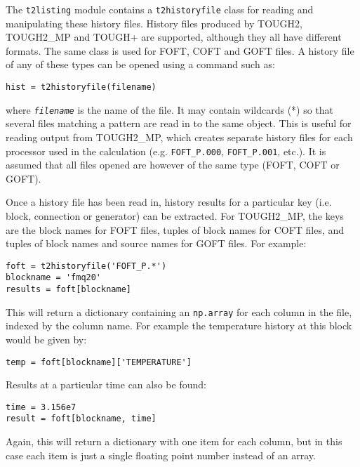 The \texttt{t2listing} module contains a \texttt{t2historyfile} class for reading and manipulating these history files.  History files produced by TOUGH2, TOUGH2\_MP and TOUGH+ are supported, although they all have different formats.  The same class is used for FOFT, COFT and GOFT files.  A history file of any of these types can be opened using a command such as:

\begin{lstlisting}
hist = t2historyfile(filename)
\end{lstlisting}

where \texttt{\emph{filename}} is the name of the file.  It may contain wildcards (*) so that several files matching a pattern are read in to the same object.  This is useful for reading output from TOUGH2\_MP, which creates separate history files for each processor used in the calculation (e.g. \texttt{FOFT\_P.000}, \texttt{FOFT\_P.001}, etc.).  It is assumed that all files opened are however of the same type (FOFT, COFT or GOFT).

Once a history file has been read in, history results for a particular key (i.e. block, connection or generator) can be extracted.  For TOUGH2\_MP, the keys are the block names for FOFT files, tuples of block names for COFT files, and tuples of block names and source names for GOFT files.  For example:

\begin{lstlisting}
foft = t2historyfile('FOFT_P.*')
blockname = 'fmq20'
results = foft[blockname]
\end{lstlisting}

This will return a dictionary containing an \texttt{np.array} for each column in the file, indexed by the column name.  For example the temperature history at this block would be given by:

\begin{lstlisting}
temp = foft[blockname]['TEMPERATURE']
\end{lstlisting}

Results at a particular time can also be found:

\begin{lstlisting}
time = 3.156e7
result = foft[blockname, time]
\end{lstlisting}

Again, this will return a dictionary with one item for each column, but in this case each item is just a single floating point number instead of an array.

